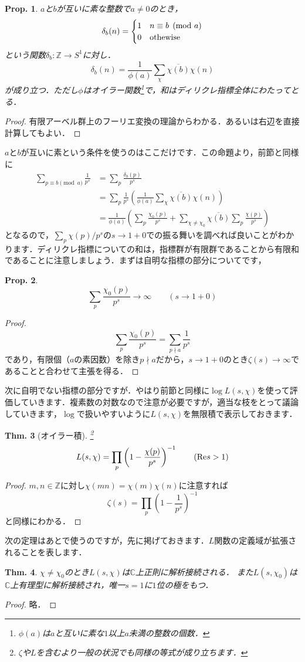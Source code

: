 \documentclass[dvipdfmx,b5paper,papersize]{jsarticle}
\newtheorem{thm}{Thm.}
\newtheorem{prop}[thm]{Prop.}
\begin{document}
\begin{prop}
$a$と$b$が互いに素な整数で$a\neq0$のとき，
\[
\delta_b(n)=\begin{cases}
1 & n\equiv b \pmod a\\
0 & {\rm othewise}
\end{cases}
\]
という関数$\delta_b:\mathbb{Z} \to S^1$に対し．
\[
\delta_b(n)=\frac{1}{\phi (a)} \sum_{\chi} \overline{\chi(b)} \chi(n)
\]
が成り立つ．ただし$\phi$はオイラー関数\footnote{$\phi(a)$は$a$と互いに素な$1$以上$a$未満の整数の個数．}で，和はディリクレ指標全体にわたってとる．
\end{prop}
\begin{proof}
有限アーベル群上のフーリエ変換の理論からわかる．あるいは右辺を直接計算してもよい．
\end{proof}
$a$と$b$が互いに素という条件を使うのはここだけです．この命題より，前節と同様に
\begin{align*}
\sum_{p\equiv b\pmod{a}}\frac{1}{p^s}&=\sum_{p}\frac{\delta_b(p)}{p^s}\\
&=\sum_{p}\frac{1}{p^s} \left ( \frac{1}{\phi(a)} \sum_{\chi}\overline{\chi(b)} \chi(n) \right)\\
&=\frac{1}{\phi(a)} \left( \sum_p \frac{\chi_{0}(p)}{p^s}+ \sum_{\chi \neq \chi_{0}}\overline{\chi(b)}\sum_p \frac{\chi(p)}{p^s} \right) \tag{1}
\end{align*}
となるので，$\sum_p {\chi(p)}/{p^s}$の$s \to 1+0$での振る舞いを調べれば良いことがわかります．ディリクレ指標についての和は，指標群が有限群であることから有限和であることに注意しましょう．まずは自明な指標の部分についてです，
\begin{prop} \label{0}
\[
\sum_p \frac{\chi_{0}(p)}{p^s} \to \infty \qquad (s \to 1+0) \tag{2}
\]
\end{prop}
\begin{proof}
\[
\sum_p \frac{\chi_{0}(p)}{p^s}=\sum_{p \nmid a} \frac{1}{p^s}
\]
であり，有限個（$a$の素因数）を除き$p \nmid a$だから，$s \to 1+0$のとき$\zeta(s) \to \infty$であることと合わせて主張を得る．
\end{proof}
次に自明でない指標の部分ですが．やはり前節と同様に$\log L(s,\chi)$を使って評価していきます．複素数の対数なので注意が必要ですが，適当な枝をとって議論していきます，$\log$で扱いやすいように$L(s,\chi)$を無限積で表示しておきます．
\begin{thm}[オイラー積]\footnote{$\zeta$や$L$を含むより一般の状況でも同様の等式が成り立ちます．}
\[
L(s,\chi)=\prod_{p}\left(1-\frac{\chi(p)}{p^s}\right)^{-1} \qquad ({\rm Re} s>1)
\]
\end{thm}
\begin{proof}
$m,n \in \mathbb{Z}$に対し$\chi(mn)=\chi(m)\chi(n)$に注意すれば
\[
\zeta(s)=\prod_{p}\left(1-\frac{1}{p^s}\right)^{-1}
\]
と同様にわかる．
\end{proof}
次の定理はあとで使うのですが，先に掲げておきます．$L$関数の定義域が拡張されることを表します．
\begin{thm} \label{解析接続}
$\chi \neq \chi_{0}$のとき$L(s,\chi)$は$\mathbb{C}$上正則に解析接続される．
また$L(s,\chi_{0})$は$\mathbb{C}$上有理型に解析接続され，唯一$s=1$に$1$位の極をもつ．
\end{thm}
\begin{proof}
略．
\end{proof}
\end{document}
